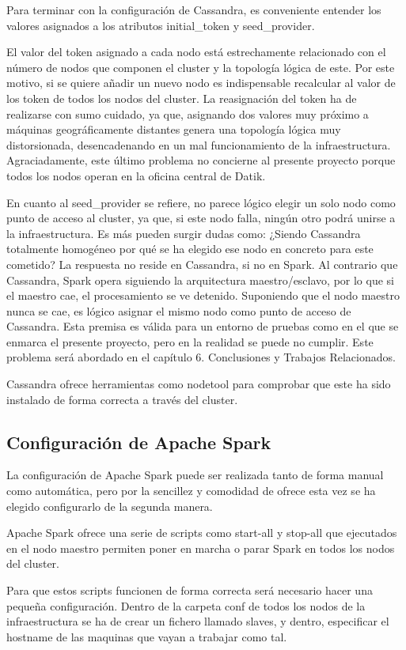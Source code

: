 Para terminar con la configuración de Cassandra, es conveniente entender los valores asignados a los atributos initial_token y seed_provider. 

El valor del token asignado a cada nodo está estrechamente relacionado con el número de nodos que componen el cluster y la topología lógica de este. Por este motivo, si se quiere añadir un nuevo nodo es indispensable recalcular al valor de los token de todos los nodos del cluster. La reasignación del token ha de realizarse con sumo cuidado,  ya que, asignando dos valores muy próximo a máquinas geográficamente distantes genera una topología lógica muy distorsionada, desencadenando en un mal funcionamiento de la infraestructura. Agraciadamente, este último problema no concierne al presente proyecto porque todos los nodos operan en la oficina central de Datik. 

En cuanto al seed_provider se refiere, no parece lógico elegir un solo nodo como punto de acceso al cluster, ya que, si este nodo falla, ningún otro podrá unirse a la infraestructura. Es más pueden surgir dudas como: ¿Siendo Cassandra totalmente homogéneo por qué se ha elegido ese nodo en concreto para este cometido? La respuesta no reside en Cassandra, si no en Spark. Al contrario que Cassandra, Spark opera siguiendo la arquitectura maestro/esclavo, por lo que si el maestro cae, el procesamiento se ve detenido. Suponiendo que el nodo maestro nunca se cae,  es lógico asignar el mismo nodo como punto de acceso de Cassandra. Esta premisa es válida para un entorno de pruebas como en el que se enmarca el presente proyecto, pero en la realidad se puede no cumplir. Este problema será abordado en el capítulo 6. Conclusiones y Trabajos Relacionados.

Cassandra ofrece herramientas como nodetool para comprobar que este ha sido instalado de forma correcta a través del cluster.


\subsection{Configuración de Apache Spark}

La configuración de Apache Spark puede ser realizada tanto de forma manual como automática, pero por la sencillez y comodidad de ofrece esta vez se ha elegido configurarlo de la segunda manera.

Apache Spark ofrece una serie de scripts como start-all y stop-all que ejecutados en el nodo maestro permiten poner en marcha o parar Spark en todos los nodos del cluster.

Para que estos scripts funcionen de forma correcta será necesario hacer una pequeña configuración. Dentro de la carpeta conf de todos los nodos de la infraestructura se ha de crear un fichero llamado slaves, y dentro, especificar el hostname de las maquinas que vayan a trabajar como tal.

